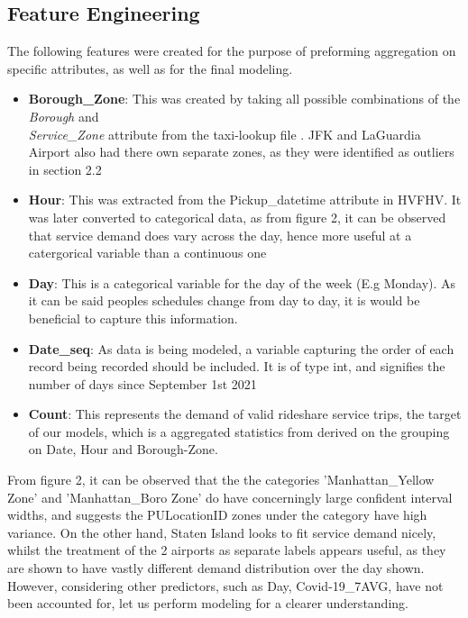 \documentclass[11pt]{article}
\begin{document}
\subsection{Feature Engineering}
The following features were created for the purpose of preforming aggregation on specific attributes, as well as for the final modeling.
\begin{itemize}
    \item \textbf{Borough\_Zone}: This was created by taking all possible combinations of the \textit{Borough} and \\
    \textit{Service\_Zone} attribute from the taxi-lookup file \cite{tlc}. JFK and LaGuardia Airport also had there own separate zones, as they were identified as outliers in section 2.2
    \item \textbf{Hour}: This was extracted from the Pickup\_datetime attribute in HVFHV. It was later converted to categorical data, as from figure 2, it can be observed that service demand does vary across the day, hence more useful at a catergorical variable than a continuous one
    \item \textbf{Day}: This is a categorical variable for the day of the week (E.g Monday). As it can be said peoples schedules change from day to day, it is would be beneficial to capture this information. 
    \item \textbf{Date\_seq}: As  data is being modeled, a variable capturing the order of each record being recorded should be included. It is of type int, and signifies the number of days since September 1st 2021
    \item \textbf{Count}: This represents the demand of valid rideshare service trips, the target of our models, which is a aggregated statistics from derived on the grouping on Date, Hour and Borough-Zone.
\end{itemize}
From figure 2, it can be observed that the the categories 'Manhattan\_Yellow Zone' and 'Manhattan\_Boro Zone' do have concerningly large confident interval widths, and suggests the PULocationID zones under the category have high variance. On the other hand, Staten Island looks to fit service demand nicely, whilst the treatment of the 2 airports as separate labels appears useful, as they are shown to have vastly different demand distribution over the day shown. However, considering other predictors, such as Day, Covid-19\_7AVG, have not been accounted for, let us perform modeling for a clearer understanding.
\end{document}

